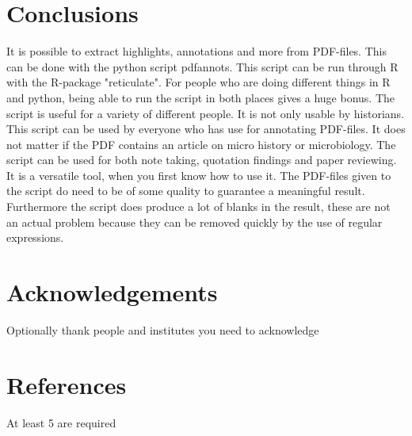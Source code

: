 \documentclass{article}
\begin{document}
\section{Conclusions}
It is possible to extract highlights, annotations and more from PDF-files. This can be done with the python script pdfannots. This script can be run through R with the R-package "reticulate". For people who are doing different things in R and python, being able to run the script in both places gives a huge bonus. The script is useful for a variety of different people. It is not only usable by historians. This script can be used by everyone who has use for annotating PDF-files. It does not matter if the PDF contains an article on micro history or microbiology. The script can be used for both note taking, quotation findings and paper reviewing. It is a versatile tool, when you first know how to use it. The PDF-files given to the script do need to be of some quality to guarantee a meaningful result. Furthermore the script does produce a lot of blanks in the result, these are not an actual problem because they can be removed quickly by the use of regular expressions. 

\section{Acknowledgements}
Optionally thank people and institutes you need to acknowledge

\section{References}
At least 5 are required
\end{document}
